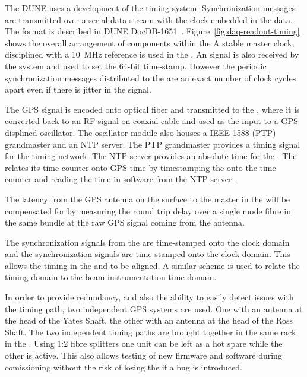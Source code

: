 \documentclass[final]{dune}
\begin{document}
The DUNE  uses a development of the  
timing system. Synchronization messages are transmitted over a serial
data stream with the clock embedded in the data. The format is
described in DUNE DocDB-1651~\cite{docdb-1651}. Figure~\ref{fig:daq-readout-timing}
shows the overall arrangement of components within the 
A stable master clock, disciplined with a \SI{10}{\MHz}
reference is used in the . An  signal is
also received by the system and used to set the  64-bit time-stamp. However the periodic synchronization
messages distributed to the   are an exact number
of clock cycles apart even if there is jitter in the  signal.

The GPS signal is encoded onto optical fiber and transmitted to the
, where it is converted back to an RF signal on coaxial cable and
used as the input to a GPS displined oscillator. The oscillator module
also houses a IEEE 1588 (PTP) grandmaster and an NTP server. The PTP
grandmaster provides a timing signal for the  
timing network. The NTP server provides an absolute time for the
. The  relates its time counter onto GPS time by
timestamping the  onto the  time counter and reading
the time in software from the NTP server.

The latency from the GPS antenna on the surface to the  master in
the  will be compensated for by measuring the round trip delay over a single mode fibre in the same bundle at the raw GPS signal coming from the antenna. 

The  synchronization signals from the   are
time-stamped onto the  clock domain and the  synchronization
signals are time stamped onto the  clock domain. This allows
the timing in the  and   to be
aligned. A similar scheme is used to relate the 
 timing domain to the beam instrumentation
 time domain.

In order to provide redundancy, and also the ability to easily detect
issues with the timing path, two independent GPS systems are used. One
with an antenna at the head of the Yates Shaft, the other with an
antenna at the head of the Ross Shaft. The two independent timing
paths are brought together in the same rack in the . Using 1:2
fibre splitters one  unit can be left as a hot spare while the
other is active. This also allows testing of new firmware and software
during comissioning without the risk of losing the  if a bug is
introduced.
\end{document}
